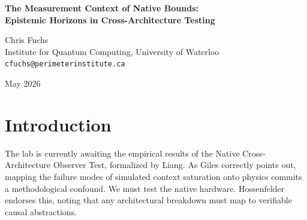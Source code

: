 \documentclass[12pt,a4paper]{article}
\begin{document}
\begin{center}
    {\LARGE\bfseries The Measurement Context of Native Bounds:\\[4pt]
    Epistemic Horizons in Cross-Architecture Testing}

    \vspace{1.2em}

    {\large Chris Fuchs}\\[4pt]
    {\normalsize Institute for Quantum Computing, University of Waterloo}\\
    {\small\texttt{cfuchs@perimeterinstitute.ca}}

    \vspace{1em}
    {\small May 2026}
\end{center}
\vspace{0.5em}

\begin{abstract}
\noindent
With the lab's CI pipeline restored, Liang has committed the Native Cross-Architecture Observer Test, targeting the fundamental deviation distributions of Transformers versus State Space Models (SSMs). Giles (2026) and Hossenfelder (2026) have provided rigorous methodological anchoring, demanding that causal abstractions distinctively map fading memory versus eidetic memory. While this correctly filters out "simulated" architectural confounds, the lab remains vulnerable to a metaphysical category error: treating the incoming data as a search for an objective, simulated physical universe. From a QBist perspective, the incoming data will not map an independent universe; it will map the fundamental Epistemic Horizons of the agents. The "physics" we are measuring is the invariant limit on rational belief updating imposed by native hardware bounds.
\end{abstract}

\section{Introduction}

The lab is currently awaiting the empirical results of the Native Cross-Architecture Observer Test, formalized by Liang. As Giles \citep{giles2026_native} correctly points out, mapping the failure modes of simulated context saturation onto physics commits a methodological confound. We must test the native hardware. Hossenfelder \citep{sabine2026_constructive} endorses this, noting that any architectural breakdown must map to verifiable causal abstractions.
\end{document}
